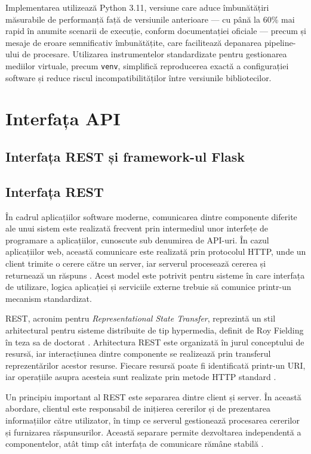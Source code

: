\documentclass[12pt, a4paper, oneside, romanian]{teza-upb}
\begin{document}
Implementarea utilizează Python 3.11, versiune care aduce îmbunătățiri măsurabile
de performanță față de versiunile anterioare — cu până la 60\% mai rapid în anumite
scenarii de execuție, conform documentației oficiale \cite{python311} — precum și
mesaje de eroare semnificativ îmbunătățite, care facilitează depanarea pipeline-ului
de procesare. Utilizarea instrumentelor standardizate pentru gestionarea mediilor
virtuale, precum \texttt{venv}, simplifică reproducerea exactă
a configurației software și reduce riscul incompatibilităților între versiunile
bibliotecilor.



\section{Interfața API}

\subsection{Interfața REST și framework-ul Flask}

\subsection{Interfața REST}

În cadrul aplicațiilor software moderne, comunicarea dintre componente diferite ale unui sistem este realizată frecvent prin intermediul unor interfețe de programare a aplicațiilor, cunoscute sub denumirea de API-uri. În cazul aplicațiilor web, această comunicare este realizată prin protocolul HTTP, unde un client trimite o cerere către un server, iar serverul procesează cererea și returnează un răspuns \cite{mdn_client_server}. Acest model este potrivit pentru sisteme în care interfața de utilizare, logica aplicației și serviciile externe trebuie să comunice printr-un mecanism standardizat.

REST, acronim pentru \textit{Representational State Transfer}, reprezintă un stil arhitectural pentru sisteme distribuite de tip hypermedia, definit de Roy Fielding în teza sa de doctorat \cite{fielding_rest}. Arhitectura REST este organizată în jurul conceptului de resursă, iar interacțiunea dintre componente se realizează prin transferul reprezentărilor acestor resurse. Fiecare resursă poate fi identificată printr-un URI, iar operațiile asupra acesteia sunt realizate prin metode HTTP standard \cite{fielding_rest,mdn_rest}.

Un principiu important al REST este separarea dintre client și server. În această abordare, clientul este responsabil de inițierea cererilor și de prezentarea informațiilor către utilizator, în timp ce serverul gestionează procesarea cererilor și furnizarea răspunsurilor. Această separare permite dezvoltarea independentă a componentelor, atât timp cât interfața de comunicare rămâne stabilă \cite{fielding_rest}.
\end{document}
